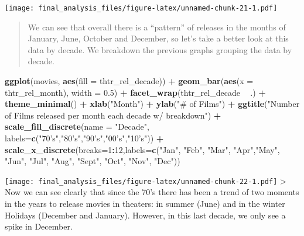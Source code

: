 \documentclass[]{article}
\newenvironment{Shaded}{\begin{snugshade}}{\end{snugshade}}
\newcommand{\KeywordTok}[1]{\textcolor[rgb]{0.13,0.29,0.53}{\textbf{#1}}}
\newcommand{\DataTypeTok}[1]{\textcolor[rgb]{0.13,0.29,0.53}{#1}}
\newcommand{\DecValTok}[1]{\textcolor[rgb]{0.00,0.00,0.81}{#1}}
\newcommand{\FloatTok}[1]{\textcolor[rgb]{0.00,0.00,0.81}{#1}}
\newcommand{\StringTok}[1]{\textcolor[rgb]{0.31,0.60,0.02}{#1}}
\newcommand{\OperatorTok}[1]{\textcolor[rgb]{0.81,0.36,0.00}{\textbf{#1}}}
\newcommand{\NormalTok}[1]{#1}
\begin{document}
\texttt{[image: final\_analysis\_files/figure-latex/unnamed-chunk-21-1.pdf]}

\begin{quote}
We can see that overall there is a ``pattern'' of releases in the months
of January, June, October and December, so let's take a better look at
this data by decade. We breakdown the previous graphs grouping the data
by decade.
\end{quote}

\begin{Shaded}
\begin{Highlighting}[]
\KeywordTok{ggplot}\NormalTok{(movies, }\KeywordTok{aes}\NormalTok{(}\DataTypeTok{fill =}\NormalTok{ thtr_rel_decade)) }\OperatorTok{+}\StringTok{ }\KeywordTok{geom_bar}\NormalTok{(}\KeywordTok{aes}\NormalTok{(}\DataTypeTok{x =}\NormalTok{ thtr_rel_month), }\DataTypeTok{width =} \FloatTok{0.5}\NormalTok{) }\OperatorTok{+}\StringTok{ }\KeywordTok{facet_wrap}\NormalTok{(thtr_rel_decade }\OperatorTok{~}\StringTok{ }\NormalTok{.) }\OperatorTok{+}\StringTok{ }\KeywordTok{theme_minimal}\NormalTok{() }\OperatorTok{+}\StringTok{ }\KeywordTok{xlab}\NormalTok{(}\StringTok{"Month"}\NormalTok{) }\OperatorTok{+}\StringTok{ }\KeywordTok{ylab}\NormalTok{(}\StringTok{"# of Films"}\NormalTok{) }\OperatorTok{+}\StringTok{ }\KeywordTok{ggtitle}\NormalTok{(}\StringTok{"Number of Films released per month each decade w/ breakdown"}\NormalTok{) }\OperatorTok{+}\StringTok{ }\KeywordTok{scale_fill_discrete}\NormalTok{(}\DataTypeTok{name =} \StringTok{"Decade"}\NormalTok{, }\DataTypeTok{labels=}\KeywordTok{c}\NormalTok{(}\StringTok{"70's"}\NormalTok{,}\StringTok{"80's"}\NormalTok{,}\StringTok{"90's"}\NormalTok{,}\StringTok{"00's"}\NormalTok{,}\StringTok{"10's"}\NormalTok{)) }\OperatorTok{+}\StringTok{ }\KeywordTok{scale_x_discrete}\NormalTok{(}\DataTypeTok{breaks=}\DecValTok{1}\OperatorTok{:}\DecValTok{12}\NormalTok{,}\DataTypeTok{labels=}\KeywordTok{c}\NormalTok{(}\StringTok{"Jan"}\NormalTok{, }\StringTok{"Feb"}\NormalTok{, }\StringTok{"Mar"}\NormalTok{, }\StringTok{"Apr"}\NormalTok{,}\StringTok{"May"}\NormalTok{, }\StringTok{"Jun"}\NormalTok{, }\StringTok{"Jul"}\NormalTok{, }\StringTok{"Aug"}\NormalTok{, }\StringTok{"Sept"}\NormalTok{, }\StringTok{"Oct"}\NormalTok{, }\StringTok{"Nov"}\NormalTok{, }\StringTok{"Dec"}\NormalTok{))}
\end{Highlighting}
\end{Shaded}

\texttt{[image: final\_analysis\_files/figure-latex/unnamed-chunk-22-1.pdf]}
\textgreater{} Now we can see clearly that since the 70's there has been
a trend of two moments in the years to release movies in theaters: in
summer (June) and in the winter Holidays (December and January).
However, in this last decade, we only see a spike in December.
\end{document}

